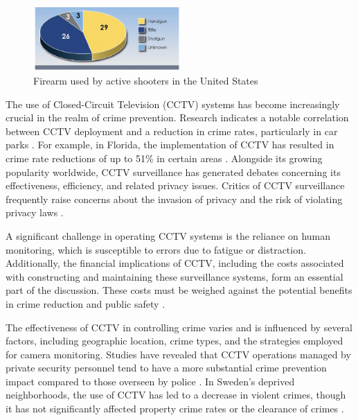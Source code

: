 \begin{figure}[h]
    \centering 
    \includegraphics[width=0.5\textwidth]{figs/firearms.png} 
    \caption{Firearm used by active shooters in the United States \cite{rfc37}}
    \label{fig:fbi-firearms}
\end{figure}

The use of Closed-Circuit Television (CCTV) systems has become increasingly crucial in the realm of crime prevention. Research indicates a notable correlation between CCTV deployment and a reduction in crime rates, particularly in car parks \cite{rfc33}. For example, in Florida, the implementation of CCTV has resulted in crime rate reductions of up to 51\% in certain areas \cite{rfc34}. Alongside its growing popularity worldwide, CCTV surveillance has generated debates concerning its effectiveness, efficiency, and related privacy issues. Critics of CCTV surveillance frequently raise concerns about the invasion of privacy and the risk of violating privacy laws \cite{rfc38}.

A significant challenge in operating CCTV systems is the reliance on human monitoring, which is susceptible to errors due to fatigue or distraction. Additionally, the financial implications of CCTV, including the costs associated with constructing and maintaining these surveillance systems, form an essential part of the discussion. These costs must be weighed against the potential benefits in crime reduction and public safety \cite{rfc38}. 

The effectiveness of CCTV in controlling crime varies and is influenced by several factors, including geographic location, crime types, and the strategies employed for camera monitoring. Studies have revealed that CCTV operations managed by private security personnel tend to have a more substantial crime prevention impact compared to those overseen by police \cite{rfc36}. In Sweden's deprived neighborhoods, the use of CCTV has led to a decrease in violent crimes, though it has not significantly affected property crime rates or the clearance of crimes \cite{rfc35}.

